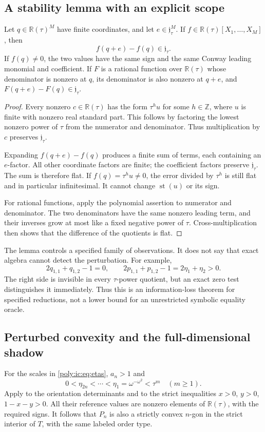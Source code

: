 \documentclass[11pt,a4paper]{article}
\numberwithin{equation}{section}
\theoremstyle{plain}
\newcommand{\R}{\mathbb R}
\newcommand{\Z}{\mathbb Z}
\newcommand{\st}{\operatorname{st}}
\newcommand{\JJ}{\mathfrak j}
\begin{document}
\subsection{A stability lemma with an explicit scope}
\begin{lemma}
\label{poly:ic:lem:stability}
Let $q\in\R(\tau)^M$ have finite coordinates, and let
$e\in\JJ_\tau^M$. If $f\in\R(\tau)[X_1,\ldots,X_M]$, then
\[
 f(q+e)-f(q)\in\JJ_\tau.
\]
If $f(q)\ne0$, the two values have the same sign and the same Conway
leading monomial and coefficient. If $F$ is a rational function over
$\R(\tau)$ whose denominator is nonzero at $q$, its denominator is also
nonzero at $q+e$, and $F(q+e)-F(q)\in\JJ_\tau$.
\end{lemma}
\begin{proof}
Every nonzero $c\in\R(\tau)$ has the form $\tau^h u$ for some
$h\in\Z$, where $u$ is finite with nonzero real standard part. This follows
by factoring the lowest nonzero power of $\tau$ from the numerator and
denominator. Thus multiplication by $c$ preserves $\JJ_\tau$.

Expanding $f(q+e)-f(q)$ produces a finite sum of terms, each containing an
$e$-factor. All other coordinate factors are finite; the coefficient
factors preserve $\JJ_\tau$. The sum is therefore flat. If
$f(q)=\tau^h u\ne0$, the error divided by $\tau^h$ is still flat and in
particular infinitesimal. It cannot change $\st(u)$ or its sign.

For rational functions, apply the polynomial assertion to numerator and
denominator. The two denominators have the same nonzero leading term,
and their inverses grow at most like a fixed negative power of $\tau$.
Cross-multiplication then shows that the difference of the quotients is flat.
\end{proof}

The lemma controls a specified family of observations. It does not say
that exact algebra cannot detect the perturbation. For example,
\begin{equation}\label{poly:ic:eq:detect}
 2q_{1,1}+q_{1,2}-1=0,
 \qquad
 2p_{1,1}+p_{1,2}-1=2\eta_1+\eta_2>0.
\end{equation}
The right side is invisible in every $\tau$-power quotient, but an exact
zero test distinguishes it immediately. Thus this is an information-loss
theorem for specified reductions, not a lower bound for an unrestricted
symbolic equality oracle.

\subsection{Perturbed convexity and the full-dimensional shadow}
For the scales in \eqref{poly:ic:eq:etas}, $a_n>1$ and
\[
 0<\eta_{2n}<\cdots<\eta_1=\omega^{-\omega^2}
                   <\tau^m\quad(m\geq1).
\]
Apply  to the orientation determinants and to the
strict inequalities $x>0$, $y>0$, $1-x-y>0$. All their reference values
are nonzero elements of $\R(\tau)$, with the required signs. It follows
that $P_n$ is also a strictly convex $n$-gon in the strict interior of $T$,
with the same labeled order type.
\end{document}
